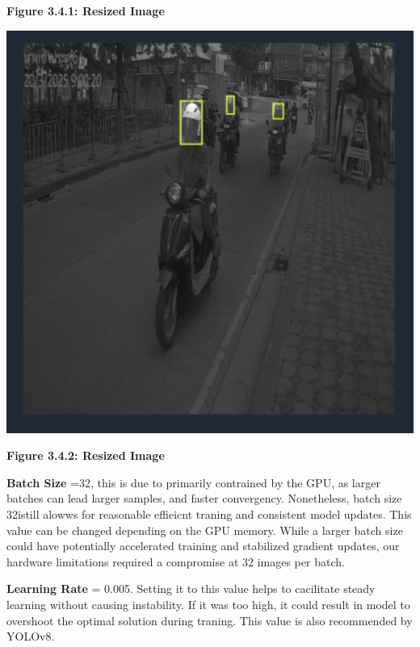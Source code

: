 \begin{center}
\begin{minipage}{0.45\textwidth}
		\textbf{Figure 3.4.1: Resized Image }
	\end{minipage}
	\hfill
	\begin{minipage}{0.45\textwidth}
		\centering
		\includegraphics[width=\linewidth]{ano2.png}
		\vspace{0.5em}
		
		\textbf{Figure 3.4.2: Resized Image }
	\end{minipage}
\end{center}




\textbf{Batch Size} =32, this is due to primarily contrained by the GPU, as larger batches can lead larger samples, and faster convergency. Nonetheless, batch size 32istill alowws for reasonable effieicnt traning and consistent model updates. This value can be changed depending on the GPU memory. While a larger batch size could have potentially accelerated training and stabilized gradient updates, our hardware limitations required a compromise at 32 images per batch.

\textbf{Learning Rate} = 0.005. Setting it to this value helps to cacilitate steady learning without causing instability. If it was too high, it could result in model to overshoot the optimal solution during traning. This value is also recommended by YOLOv8.




